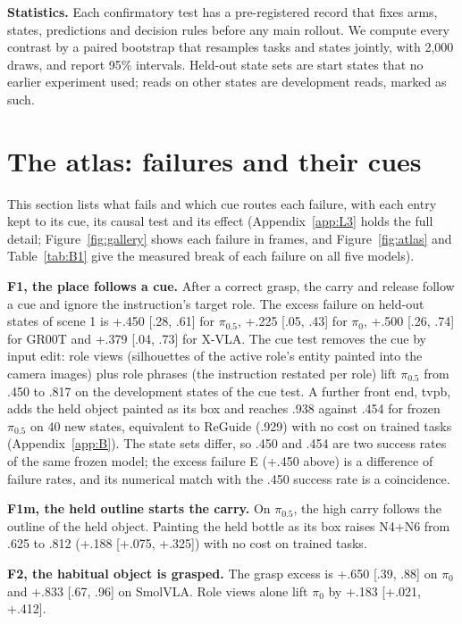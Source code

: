 \documentclass{article}
\newcommand{\pifive}{$\pi_{0.5}$}
\newcommand{\pizero}{$\pi_0$}
\begin{document}
\textbf{Statistics.} Each confirmatory test has a pre-registered record that fixes arms, states, predictions and decision rules before any main rollout. We compute every contrast by a paired bootstrap that resamples tasks and states jointly, with 2,000 draws, and report 95\% intervals. Held-out state sets are start states that no earlier experiment used; reads on other states are development reads, marked as such.

\section{The atlas: failures and their cues}
\label{sec:atlas}

This section lists what fails and which cue routes each failure, with each entry kept to its cue, its causal test and its effect (Appendix~\ref{app:L3} holds the full detail; Figure~\ref{fig:gallery} shows each failure in frames, and Figure~\ref{fig:atlas} and Table~\ref{tab:B1} give the measured break of each failure on all five models).

\textbf{F1, the place follows a cue.} After a correct grasp, the carry and release follow a cue and ignore the instruction's target role. The excess failure on held-out states of scene 1 is +.450 [.28, .61] for \pifive, +.225 [.05, .43] for \pizero, +.500 [.26, .74] for GR00T and +.379 [.04, .73] for X-VLA. The cue test removes the cue by input edit: role views (silhouettes of the active role's entity painted into the camera images) plus role phrases (the instruction restated per role) lift \pifive{} from .450 to .817 on the development states of the cue test. A further front end, tvpb, adds the held object painted as its box and reaches .938 against .454 for frozen \pifive{} on 40 new states, equivalent to ReGuide (.929) with no cost on trained tasks (Appendix~\ref{app:B}). The state sets differ, so .450 and .454 are two success rates of the same frozen model; the excess failure E (+.450 above) is a difference of failure rates, and its numerical match with the .450 success rate is a coincidence.

\textbf{F1m, the held outline starts the carry.} On \pifive, the high carry follows the outline of the held object. Painting the held bottle as its box raises N4+N6 from .625 to .812 (+.188 [+.075, +.325]) with no cost on trained tasks.

\textbf{F2, the habitual object is grasped.} The grasp excess is +.650 [.39, .88] on \pizero{} and +.833 [.67, .96] on SmolVLA. Role views alone lift \pizero{} by +.183 [+.021, +.412].
\end{document}
